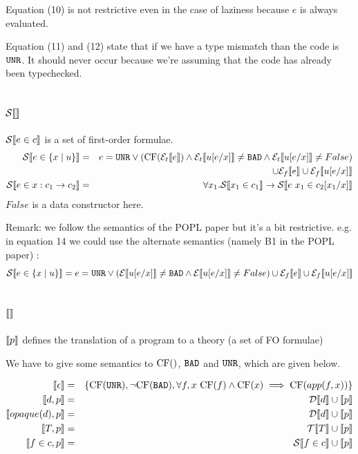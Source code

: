 \documentclass{article}
\begin{document}
Equation (10) is not restrictive even in the case of laziness because $e$ is always evaluated.

Equation (11) and (12) state that if we have a type mismatch than the code is $\texttt{UNR}$. It should never occur because we're assuming that the code has already been typechecked.


\subsection{$\mathcal{S} \llbracket  \rrbracket$}
$\mathcal{S} \llbracket e \in c \rrbracket$ is a set of first-order formulae.
\begin{eqnarray}
\mathcal{S} \llbracket e \in \{x \mid u \} \rrbracket &=& e = \texttt{UNR} \lor (\mbox{CF}(\mathcal{E}_t \llbracket e \rrbracket) \land \mathcal{E}_t \llbracket u[e/x] \rrbracket \neq \texttt{BAD} \land \mathcal{E}_t \llbracket u[e/x] \rrbracket \neq False)\\
&& \cup \mathcal{E}_{f} \llbracket e \rrbracket \cup \mathcal{E}_{f} \llbracket u[e/x] \rrbracket\\
\mathcal{S} \llbracket e \in x:c_1 \to c_2 \rrbracket  &=& \forall x_1. \mathcal{S} \llbracket x_1 \in c_1 \rrbracket \to \mathcal{S} \llbracket e~x_1 \in c_2[x_1/x] \rrbracket
\end{eqnarray}
$False$ is a data constructor here.

Remark: we follow the semantics of the POPL paper but it's a bit restrictive.
e.g. in equation 14 we could use the alternate semantics (namely B1 in the POPL paper) : 
$$\mathcal{S} \llbracket e \in \{x \mid u \} \rrbracket = e = \texttt{UNR} \lor (\mathcal{E} \llbracket u[e/x] \rrbracket \neq \texttt{BAD} \land \mathcal{E} \llbracket u[e/x] \rrbracket \neq False) \cup \mathcal{E}_{f} \llbracket e \rrbracket \cup \mathcal{E}_{f} \llbracket u[e/x] \rrbracket$$

\subsection{$\llbracket  \rrbracket$}
$\llbracket p \rrbracket$ defines the translation of a program to a theory (a set of FO formulae)

We have to give some semantics to $\mbox{CF}()$, $\texttt{BAD}$ and $\texttt{UNR}$, which are given below.

\begin{eqnarray}
\llbracket \epsilon \rrbracket &=& \{ \mbox{CF}(\texttt{UNR}), \lnot \mbox{CF}(\texttt{BAD}), \forall f,x~\mbox{CF}(f) \land \mbox{CF}(x) \implies \mbox{CF}(app(f,x)) \}\\
\llbracket d,p \rrbracket &=& \mathcal{D} \llbracket d \rrbracket \cup \llbracket p \rrbracket\\
\llbracket opaque(d),p \rrbracket &=& \mathcal{D} \llbracket d \rrbracket \cup \llbracket p \rrbracket\\
\llbracket T,p \rrbracket &=& \mathcal{T} \llbracket T \rrbracket \cup \llbracket p \rrbracket\\
\llbracket f \in c,p \rrbracket &=& \mathcal{S} \llbracket f \in c \rrbracket \cup \llbracket p \rrbracket\\
\end{eqnarray}
\end{document}
